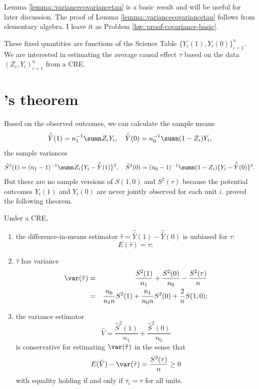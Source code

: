 Lemma \ref{lemma::variancecovariancetau}  is a basic result and will be useful for later discussion. 
The proof of Lemma \ref{lemma::variancecovariancetau} follows from elementary algebra. I leave it as Problem \ref{hw::proof-covariance-basic}. 

These fixed quantities are functions of the Science Table $\{ Y_i(1), Y_i(0)  \}_{i=1}^n$. We are interested in estimating the average causal effect $\tau$ based on the data $ (Z_i, Y_i)_{i=1}^n$ from a CRE. 


\section{\citet{Neyman:1923}'s theorem}


Based on the observed outcomes, we can calculate the sample means
$$
\hat{\bar{Y}}(1) = n_1^{-1} \sumn Z_i Y_i,\quad
\hat{\bar{Y}}(0) = n_0^{-1} \sumn (1-Z_i) Y_i,
$$
the sample variances
$$
\hat{S}^2(1) = (n_1 - 1)^{-1} \sumn Z_i  \{  Y_i - \hat{\bar{Y}}(1) \}^2,\quad
\hat{S}^2(0) = (n_0 - 1)^{-1} \sumn (1-Z_i)  \{  Y_i - \hat{\bar{Y}}(0) \}^2 . 
$$
But there are no sample versions of $S(1,0)$ and $S^2(\tau)$ because the potential outcomes $Y_i(1)$ and $Y_i(0)$ are never jointly observed for each unit $i$. \citet{Neyman:1923} proved the following theorem. 




\begin{theorem}
\label{thm::neyman1923}
Under a CRE, 
\begin{enumerate}
\item
the difference-in-means estimator $\hat{\tau} =\hat{\bar{Y}}(1) -  \hat{\bar{Y}}(0)$ is unbiased for $\tau$:
$$
E(\hat{\tau}) =\tau ;
$$ 
\item
$\hat{\tau} $ has variance 
\begin{eqnarray}
\var(\hat{\tau})  &=&  \frac{S^2(1)}{n_1} + \frac{S^2(0)}{n_0} - \frac{S^2(\tau)}{n} \label{eq::neyman23var} \\
&=& \frac{n_0}{n_1 n} S^2(1) + \frac{n_1}{n_0 n} S^2(0) + \frac{2}{n} S(1,0) ;  \label{eq::neyman23var-equivalent}
\end{eqnarray}
\item\label{neyman-3}
the variance estimator 
$$
\hat{V} = \frac{\hat{S}^2(1)}{n_1} + \frac{\hat{S}^2(0)}{n_0}
$$
is conservative for estimating $\var(\hat{\tau})$ in the sense that 
$$
E(\hat{V} ) - \var(\hat{\tau})  = \frac{S^2(\tau)}{n}  \geq 0
$$
with equality holding if and only if $\tau_i = \tau$ for all units. 
\end{enumerate}
\end{theorem}

